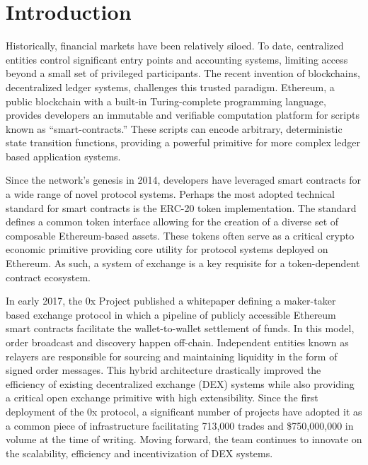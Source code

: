 \documentclass[10pt]{article}
\begin{document}

\tableofcontents
\pagebreak


\section{Introduction}\label{intro}
Historically, financial markets have been relatively siloed. To date, centralized entities control significant entry points and accounting systems, limiting access beyond a small set of privileged participants\cite{capital-markets-report}. The recent invention of blockchains, decentralized ledger systems, challenges this trusted paradigm. Ethereum, a public blockchain with a built-in Turing-complete programming language, provides developers an immutable and verifiable computation platform for scripts known as ``smart-contracts.'' These scripts can encode arbitrary, deterministic state transition functions, providing a powerful primitive for more complex ledger based application systems\cite{ethereum-whitepaper}.
\medskip

Since the network’s genesis in 2014, developers have leveraged smart contracts for a wide range of novel protocol systems. Perhaps the most adopted technical standard for smart contracts is the ERC-20 token implementation\cite{erc-20}. The standard defines a common token interface allowing for the creation of a diverse set of composable Ethereum-based assets. These tokens often serve as a critical crypto economic primitive providing core utility for protocol systems deployed on Ethereum. As such, a system of exchange is a key requisite for a token-dependent contract ecosystem.
\medskip

In early 2017, the 0x Project published a whitepaper defining a maker-taker based exchange  protocol in which a pipeline of publicly accessible Ethereum smart contracts facilitate the wallet-to-wallet settlement of funds. In this model, order broadcast and discovery happen off-chain. Independent entities known as relayers are responsible for sourcing and maintaining liquidity in the form of signed order messages. This hybrid architecture drastically improved the efficiency of existing decentralized exchange (DEX) systems while also providing a critical open exchange primitive with high extensibility\cite{0x-wp}. Since the first deployment of the 0x protocol, a significant number of projects have adopted it as a common piece of infrastructure facilitating 713,000 trades and \$750,000,000 in volume at the time of writing. Moving forward, the team continues to innovate on the scalability, efficiency and incentivization of DEX systems.
\medskip
\end{document}
